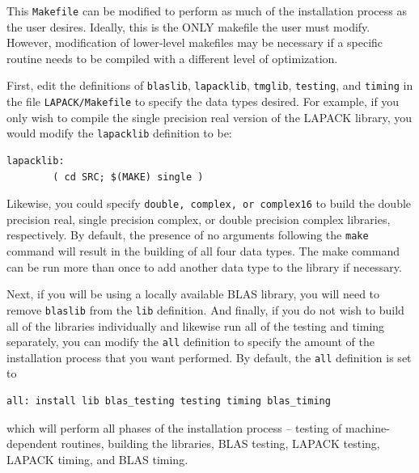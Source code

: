 \documentclass[11pt]{report}
\begin{document}
This \texttt{Makefile} can be modified to perform as much of the
installation process as the user desires.  Ideally, this is the ONLY
makefile the user must modify.  However, modification of lower-level
makefiles may be necessary if a specific routine needs to be compiled
with a different level of optimization.  

First, edit the definitions of \texttt{blaslib}, \texttt{lapacklib},
\texttt{tmglib}, \texttt{testing}, and \texttt{timing} in the file \texttt{LAPACK/Makefile}
to specify the data types desired.  For example,
if you only wish to compile the single precision real version of the
LAPACK library, you would modify the \texttt{lapacklib} definition to be:

\begin{verbatim}
lapacklib:
        ( cd SRC; $(MAKE) single )
\end{verbatim}

Likewise, you could specify \texttt{double, complex, or complex16} to
build the double precision real, single precision complex, or double
precision complex libraries, respectively.  By default, the presence of
no arguments following the \texttt{make} command will result in the
building of all four data types.
The make command can be run more than once to add another
data type to the library if necessary.

      
Next, if you will be using a locally available BLAS library, you will need
to remove \texttt{blaslib} from the \texttt{lib} definition.  And finally,
if you do not wish to build all of the libraries individually and
likewise run all of the testing and timing separately, you can
modify the \texttt{all} definition to specify the amount of the
installation process that you want performed.  By default,
the \texttt{all} definition is set to
\begin{verbatim}
all: install lib blas_testing testing timing blas_timing
\end{verbatim}
which will perform all phases of the installation
process -- testing of machine-dependent routines, building the libraries,
BLAS testing, LAPACK testing, LAPACK timing, and BLAS timing.
\end{document}
